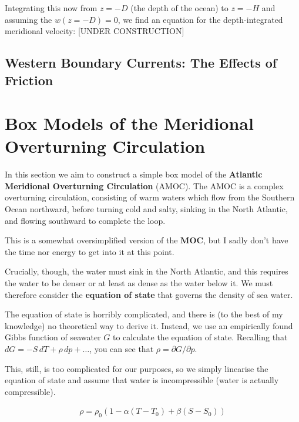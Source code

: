 Integrating this now from $z=-D$ (the depth of the ocean) to $z=-H$ and assuming the $w(z=-D)=0$, we find an equation for the depth-integrated meridional velocity:
[UNDER CONSTRUCTION]

\subsection{Western Boundary Currents: The Effects of Friction}

\section{Box Models of the Meridional Overturning Circulation}\label{MOC}

In this section we aim to construct a simple box model of the \textbf{Atlantic Meridional Overturning Circulation} (AMOC). The AMOC is a complex overturning circulation, consisting of warm waters which flow from the Southern Ocean northward, before turning cold and salty, sinking in the North Atlantic, and flowing southward to complete the loop.

This is a somewhat oversimplified version of the \textbf{MOC}, but I sadly don't have the time nor energy to get into it at this point. 

Crucially, though, the water must sink in the North Atlantic, and this requires the water to be denser or at least as dense as the water below it. We must therefore consider the \textbf{equation of state} that governs the density of sea water.

The equation of state is horribly complicated, and there is (to the best of my knowledge) no theoretical way to derive it. Instead, we use an empirically found Gibbs function of seawater $G$ to calculate the equation of state. Recalling that $dG = -S\,dT + \rho\,dp+\dots$, you can see that $\rho=\partial G/\partial p$.

This, still, is too complicated for our purposes, so we simply linearise the equation of state and assume that water is incompressible (water is actually compressible).

\begin{gather}
    \rho=\rho_0(1-\alpha (T-T_0)+\beta(S-S_0))
\end{gather}